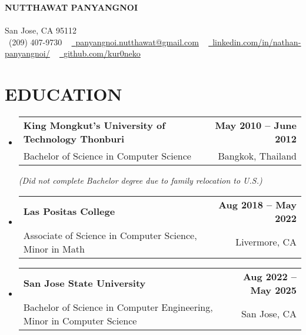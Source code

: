 \documentclass[letterpaper,11pt]{article}
\makeatletter
\newcommand{\resumeSubheading}[4]{
  \vspace{-2pt}\item
    \begin{tabular*}{1.0\textwidth}[t]{l@{\extracolsep{\fill}}r}
      \textbf{#1} & \textbf{\small #2} \\
      {\small#3} & {\small #4} \\
    \end{tabular*}\vspace{-7pt}
}
\newcommand{\resumeSubHeadingListStart}{\begin{itemize}[leftmargin=0.0in, label={}]}
\newcommand{\resumeSubHeadingListEnd}{\end{itemize}}
\makeatother
\begin{document}
\vspace{-10pt}
\begin{center}
    {\Huge \scshape\textbf {NUTTHAWAT PANYANGNOI}}\\ 
    \vspace{1pt}{https://kur0neko.com}\\ \vspace{1pt} 
    \vspace{0.5pt} San Jose, CA 95112 \\ \vspace{0.5pt}
    \small \raisebox{-0.1\height}\faPhone\ (209) 407-9730 ~ \href{mailto:panyangnoi.nutthawat@gmail.com}{\raisebox{-0.2\height}\faEnvelope\  \underline{panyangnoi.nutthawat@gmail.com}} ~ 
    \href{https://www.linkedin.com/in/nathan-panyangnoi/}{\raisebox{-0.2\height}\faLinkedin\ \underline{linkedin.com/in/nathan-panyangnoi/}}  ~
    \href{https://github.com/kur0neko}{\raisebox{-0.2\height}\faGithub\ \underline{github.com/kur0neko}}
    \vspace{-8pt}
\end{center}


\section{EDUCATION}

  \resumeSubHeadingListStart
    \resumeSubheading
      {King Mongkut’s University of Technology Thonburi}{May 2010 -- June 2012}
      {Bachelor of Science in Computer Science} {Bangkok, Thailand}
      \newline
      \textit{(Did not complete Bachelor degree due to family relocation to U.S.) }
      \resumeSubheading
      {Las Positas College}{Aug 2018 -- May 2022}
      {Associate of Science in Computer Science, Minor in Math}{Livermore, CA}
    \resumeSubheading
      {San Jose State University}{Aug 2022 -- May 2025}
      {Bachelor of Science in Computer Engineering, Minor in Computer Science}{San Jose, CA}  
  \resumeSubHeadingListEnd

\end{document}
